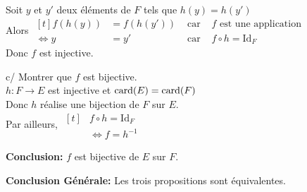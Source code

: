\documentclass[12pt,twoside,a4paper]{article}
\begin{document}
\begin{preuve}
\begin{liste}
\begin{liste}
						Soit $y$ et $y'$ deux \'el\'ements de $F$ tels que $h(y)=h(y')$\\
						Alors 
						$\begin{aligned}[t]
						f(h(y))&=f(h(y')) & \text{ car } & f\text{ est une application}\\
						\iff y&=y' & \text{ car } & f\circ h = \text{Id}_F
						\end{aligned}$\\
						Donc $f$ est injective.
					\item[c/] Montrer que $f$ est bijective.\\
						$h:F\longrightarrow E$ est injective et $\text{card}(E)=\text{card}(F)$\\
						Donc $h$ r\'ealise une bijection de $F$ sur $E$.\\
						Par ailleurs,
						$\begin{aligned}[t]
						& f\circ h=\text{Id}_F\\
						&\iff f=h^{-1}
						\end{aligned}$
				\end{liste}
				\textbf{Conclusion:} $f$ est bijective de $E$ sur $F$.
		\end{liste}
		\begin{flushleft}
			\textbf{Conclusion G\'en\'erale:} Les trois propositions sont \'equivalentes.
		\end{flushleft}
	\end{preuve}
\end{document}
